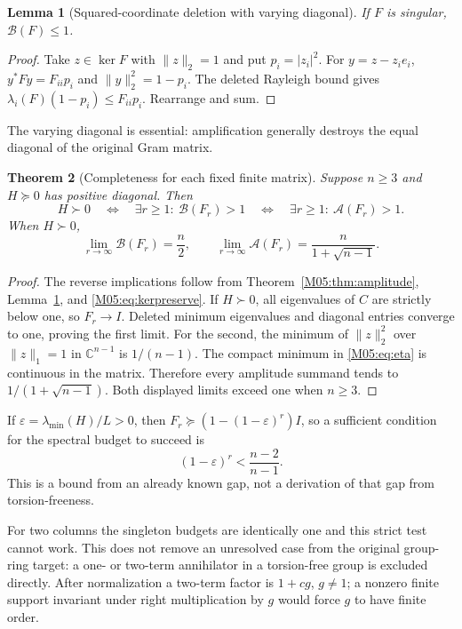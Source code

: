 \documentclass[11pt,a4paper,oneside]{report}
\newtheorem{theorem}{Theorem}[section]
\newtheorem{lemma}[theorem]{Lemma}
\theoremstyle{definition}
\theoremstyle{remark}
\newcommand{\C}{\mathbb C}
\newcommand{\BB}{\mathcal B}
\newcommand{\ABudget}{\mathcal A}
\begin{document}
\begin{lemma}[Squared-coordinate deletion with varying diagonal]
\label{M05:lem:quadratic}
If $F$ is singular, $\BB(F)\le1$.
\end{lemma}
\begin{proof}
Take $z\in\ker F$ with $\|z\|_2=1$ and put $p_i=|z_i|^2$.
For $y=z-z_ie_i$,
$y^*Fy=F_{ii}p_i$ and $\|y\|_2^2=1-p_i$.
The deleted Rayleigh bound gives
$\lambda_i(F)(1-p_i)\le F_{ii}p_i$.
Rearrange and sum.
\end{proof}
The varying diagonal is essential: amplification generally
destroys the equal diagonal of the original Gram matrix.

\begin{theorem}[Completeness for each fixed finite matrix]
\label{M05:thm:complete}
Suppose $n\ge3$ and $H\succeq0$ has positive diagonal. Then
\begin{equation}\label{M05:eq:complete}
 H\succ0
 \quad\Longleftrightarrow\quad
 \exists r\ge1:\ \BB(F_r)>1
 \quad\Longleftrightarrow\quad
 \exists r\ge1:\ \ABudget(F_r)>1 .
\end{equation}
When $H\succ0$,
\[
 \lim_{r\to\infty}\BB(F_r)=\frac n2,\qquad
 \lim_{r\to\infty}\ABudget(F_r)=\frac{n}{1+\sqrt{n-1}}.
\]
\end{theorem}
\begin{proof}
The reverse implications follow from
Theorem~\ref{M05:thm:amplitude}, Lemma~\ref{M05:lem:quadratic}, and
\eqref{M05:eq:kerpreserve}. If $H\succ0$, all eigenvalues of $C$ are
strictly below one, so $F_r\to I$. Deleted minimum eigenvalues and
diagonal entries converge to one, proving the first limit.
For the second, the minimum of $\|z\|_2^2$ over
$\|z\|_1=1$ in $\C^{n-1}$ is $1/(n-1)$. The compact minimum in
\eqref{M05:eq:eta} is continuous in the matrix. Therefore every
amplitude summand tends to $1/(1+\sqrt{n-1})$.
Both displayed limits exceed one when $n\ge3$.
\end{proof}

If $\varepsilon=\lambda_{\min}(H)/L>0$, then
$F_r\succeq(1-(1-\varepsilon)^r)I$, so a sufficient condition
for the spectral budget to succeed is
\begin{equation}\label{M05:eq:gapbound}
 (1-\varepsilon)^r<\frac{n-2}{n-1}.
\end{equation}
This is a bound from an already known gap, not a derivation of
that gap from torsion-freeness.

For two columns the singleton budgets are identically one and
this strict test cannot work. This does not remove an unresolved
case from the original group-ring target: a one- or two-term
annihilator in a torsion-free group is excluded directly. After
normalization a two-term factor is $1+cg$, $g\ne1$; a nonzero
finite support invariant under right multiplication by $g$ would
force $g$ to have finite order.
\end{document}
